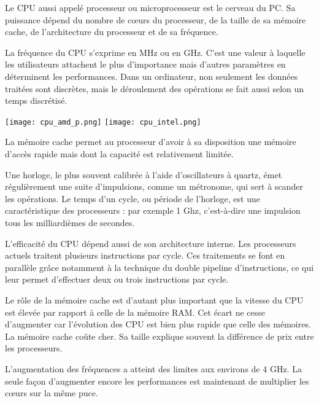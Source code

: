 \noindent\begin{minipage}[c]{.65\linewidth}
Le CPU aussi appelé processeur ou microprocesseur est le cerveau du PC. Sa puissance dépend du nombre de cœurs du processeur, de la taille de sa mémoire cache, de l'architecture du processeur et de sa fréquence.

La fréquence du CPU s'exprime en MHz ou en GHz. C'est une valeur à laquelle les utilisateurs
attachent le plus d'importance mais d'autres paramètres en déterminent les performances.
Dans un ordinateur, non seulement les données traitées sont discrètes, mais le déroulement
des opérations se fait aussi selon un temps discrétisé.
\end{minipage}\hfill
\begin{minipage}[c]{.3\linewidth}
\begin{center}
\texttt{[image: cpu\_amd\_p.png]}
\texttt{[image: cpu\_intel.png]}
\end{center}
\end{minipage}

\vspace{.25cm}

La mémoire cache permet au processeur d'avoir à sa disposition une mémoire d'accès rapide mais dont la capacité est relativement limitée. 


Une horloge, le plus souvent calibrée à l'aide d'oscillateurs à quartz, émet régulièrement une suite d'impulsions, comme un métronome, qui sert à scander les opérations. Le temps d'un
cycle, ou période de l'horloge, est une caractéristique des processeurs : par exemple 1 Ghz,
c'est-à-dire une impulsion tous les milliardièmes de secondes.

L'efficacité du CPU dépend aussi de son architecture interne. Les processeurs actuels
traitent plusieurs instructions par cycle. Ces traitements se font en parallèle grâce
notamment à la technique du double pipeline d'instructions, ce qui leur permet d'effectuer
deux ou trois instructions par cycle.

Le rôle de la mémoire cache est d'autant plus important que la vitesse du CPU est élevée par
rapport à celle de la mémoire RAM. Cet écart ne cesse d'augmenter car l'évolution des CPU est bien plus rapide que celle des
mémoires. La mémoire cache coûte cher. Sa taille explique souvent la différence de prix
entre les processeurs.

L'augmentation des fréquences a atteint des limites aux environs de 4 GHz. La seule façon
d'augmenter encore les performances est maintenant de multiplier les cœurs sur la même
puce.


